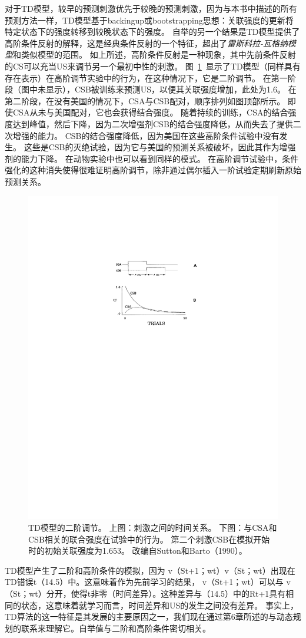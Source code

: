 {对于TD模型，较早的预测刺激优先于较晚的预测刺激，因为与本书中描述的所有预测方法一样，TD模型基于backingup或bootstrapping思想：关联强度的更新将特定状态下的强度转移到较晚状态下的强度。
自举的另一个结果是TD模型提供了高阶条件反射的解释，这是经典条件反射的一个特征，超出了\textit{雷斯科拉-瓦格纳模型}和类似模型的范围。
如上所述，高阶条件反射是一种现象，其中先前条件反射的CS可以充当US来调节另一个最初中性的刺激。
图~\ref{fig:11_5}~显示了TD模型（同样具有存在表示）在高阶调节实验中的行为，在这种情况下，它是二阶调节。
在第一阶段（图中未显示），CSB被训练来预测US，以便其关联强度增加，此处为1.6。
在第二阶段，在没有美国的情况下，CSA与CSB配对，顺序排列如图顶部所示。
即使CSA从未与美国配对，它也会获得结合强度。
随着持续的训练，CSA的结合强度达到峰值，然后下降，因为二次增强剂CSB的结合强度降低，从而失去了提供二次增强的能力。
CSB的结合强度降低，因为美国在这些高阶条件试验中没有发生。
这些是CSB的灭绝试验，因为它与美国的预测关系被破坏，因此其作为增强剂的能力下降。
在动物实验中也可以看到同样的模式。
在高阶调节试验中，条件强化的这种消失使得很难证明高阶调节，除非通过偶尔插入一阶试验定期刷新原始预测关系。


\begin{figure}[!htb]
	\centering
	\includegraphics[width=0.5\linewidth]{chap11/fig_11_5}
	\caption{TD模型的二阶调节。
		上图：刺激之间的时间关系。
		下图：与CSA和CSB相关的联合强度在试验中的行为。
		第二个刺激CSB在模拟开始时的初始关联强度为1.653。
		改编自Sutton和Barto（1990）。 \label{fig:11_5}}
\end{figure}


TD模型产生了二阶和高阶条件的模拟，因为 v（St+1；wt）v（St；wt）出现在TD错误t（14.5）中。这意味着作为先前学习的结果， v（St+1；wt）可以与 v（St；wt）分开，使得t非零（时间差异）。这种差异与（14.5）中的Rt+1具有相同的状态，这意味着就学习而言，时间差异和US的发生之间没有差异。
事实上，TD算法的这一特征是其发展的主要原因之一，我们现在通过第6章所述的与动态规划的联系来理解它。自举值与二阶和高阶条件密切相关。


}
